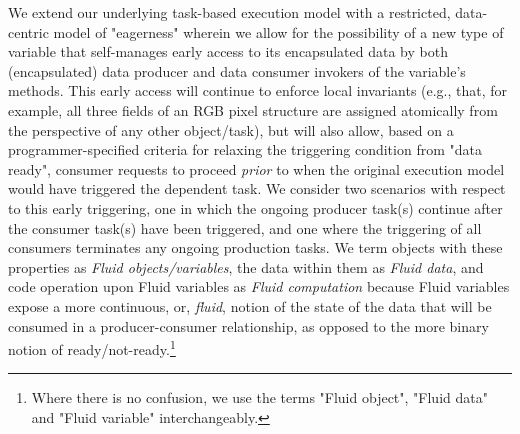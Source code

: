 We extend our underlying task-based execution model with a restricted, data-centric model of "eagerness" wherein we allow for the possibility of a new type of variable that self-manages early access to its encapsulated data by both (encapsulated) data producer and data consumer invokers of the variable's methods. This early access will continue to enforce local invariants (e.g., that, for example, all three fields of an RGB pixel structure are assigned atomically from the perspective of any other object/task), but will also allow, based on a programmer-specified criteria for relaxing the triggering condition from "data ready", consumer requests to proceed {\em prior} to when the original execution model would have triggered the dependent task. We consider two scenarios with respect to this early triggering, one in which the  ongoing producer task(s) continue after the consumer task(s) have been triggered, and one where the triggering of all consumers terminates any ongoing production tasks. We term objects with these properties as \emph{Fluid objects/variables}, the data within them as \emph{Fluid data}, and code operation upon Fluid variables as \emph{Fluid computation} because Fluid variables expose a more continuous, or, {\em fluid}, notion of the state of the data that will be consumed in a producer-consumer relationship, as opposed to the more binary notion of ready/not-ready.\footnote{Where there is no confusion, we use the terms "Fluid object", "Fluid data" and "Fluid variable" interchangeably.}


\vspace{-0.05in}
